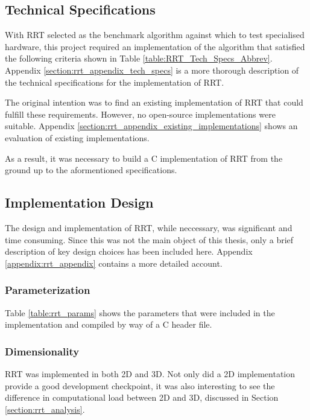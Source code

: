 

\subsection{Technical Specifications}

    With \gls{RRT} selected as the benchmark algorithm against which to test specialised hardware, this project required an implementation of the algorithm that satisfied the following criteria shown in Table \ref{table:RRT_Tech_Specs_Abbrev}. Appendix \ref{section:rrt_appendix_tech_specs} is a more thorough description of the technical specifications for the implementation of RRT. 

    

    The original intention was to find an existing implementation of RRT that could fulfill these requirements. However, no open-source implementations were suitable. Appendix \ref{section:rrt_appendix_existing_implementations} shows an evaluation of existing implementations.

    As a result, it was necessary to build a C implementation of RRT from the ground up to the aformentioned specifications.

\subsection{Implementation Design}
    The design and implementation of \gls{RRT}, while neccessary, was significant and time consuming. Since this was not the main object of this thesis, only a brief description of key design choices has been included here. Appendix \ref{appendix:rrt_appendix} contains a more detailed account.

    \subsubsection{Parameterization}
        Table \ref{table:rrt_params} shows the parameters that were included in the implementation and compiled by way of a C header file.
        

    \subsubsection{Dimensionality}
        \gls{RRT} was implemented in both \gls{2D} and \gls{3D}. Not only did a \gls{2D} implementation provide a good development checkpoint, it was also interesting to see the difference in computational load between \gls{2D} and \gls{3D}, discussed in Section \ref{section:rrt_analysis}.

